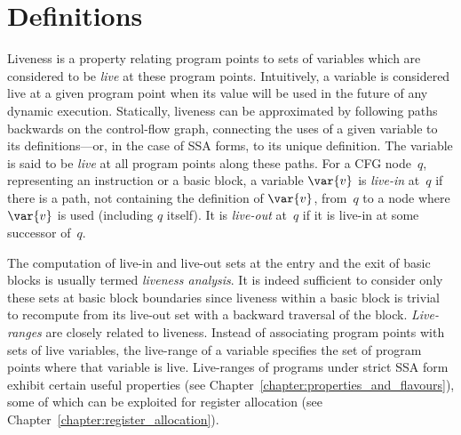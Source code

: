 \section{Definitions}
Liveness is a property relating program points to sets of variables which are considered to be \emph{live} at these program points.
Intuitively, a variable is considered live at a given program point when its value will be used in the future of any dynamic execution.
Statically, liveness can be approximated by following paths backwards on the control-flow graph, connecting the uses of a given variable to its definitions---or, in the case of SSA forms, to its unique definition.
The variable is said to be \emph{live} at all program points along these paths.
For a CFG node~$q$, representing an instruction or a basic block, a variable $\var{v}$ is \emph{live-in} at~$q$ if there is a path, not containing the definition of $\var{v}$, from~$q$ to a node where $\var{v}$ is used (including $q$ itself).
It is \emph{live-out} at~$q$ if it is live-in at some successor of~$q$.

The computation of live-in and live-out sets at the entry and the exit of basic blocks is usually termed \emph{liveness analysis}.
It is indeed sufficient to consider only these sets at basic block boundaries since liveness within a basic block is trivial to recompute from its live-out set with a backward traversal of the block.
\emph{Live-ranges} are closely related to liveness.
Instead of associating program points with sets of live variables, the live-range of a variable specifies the set of program points where that variable is live.
Live-ranges of programs under strict SSA form exhibit certain useful properties (see Chapter~\ref{chapter:properties_and_flavours}), some of which can be exploited for register allocation (see Chapter~\ref{chapter:register_allocation}).

